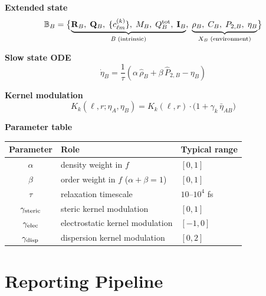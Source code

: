 \documentclass[11pt]{article}
\begin{document}
\begin{specbox}
\textbf{Extended state}
\begin{equation*}
  \mathbb{B}_B = \bigl\{
	\underbrace{
	  \mathbf{R}_B,\;
	  \mathbf{Q}_B,\;
	  \{c_{\ell m}^{(k)}\},\;
	  M_B,\;
	  Q_B^{\rm tot},\;
	  \mathbf{I}_B
	}_{B\;\text{(intrinsic)}},\;
	\underbrace{
	  \rho_B,\;
	  C_B,\;
	  P_{2,B},\;
	  \eta_B
	}_{X_B\;\text{(environment)}}
  \bigr\}
\end{equation*}

\medskip
\textbf{Slow state ODE}
\begin{equation*}
  \dot\eta_B = \frac{1}{\tau}\!\left(
	\alpha\,\hat\rho_B + \beta\,\hat P_{2,B} - \eta_B
  \right)
\end{equation*}

\medskip
\textbf{Kernel modulation}
\begin{equation*}
  K_k(\ell,r;\eta_A,\eta_B) = K_k(\ell,r)\cdot\bigl(1+\gamma_k\,\bar\eta_{AB}\bigr)
\end{equation*}

\medskip
\textbf{Parameter table}

\begin{center}
\begin{tabular}{cll}
  \toprule
  \textbf{Parameter} & \textbf{Role} & \textbf{Typical range} \\
  \midrule
  $\alpha$                    & density weight in $f$               & $[0,1]$ \\
  $\beta$                     & order weight in $f$ \;($\alpha+\beta=1$) & $[0,1]$ \\
  $\tau$                      & relaxation timescale                 & $10$--$10^4$ fs \\
  $\gamma_{\rm steric}$       & steric kernel modulation             & $[0,1]$ \\
  $\gamma_{\rm elec}$         & electrostatic kernel modulation      & $[-1,0]$ \\
  $\gamma_{\rm disp}$         & dispersion kernel modulation         & $[0,2]$ \\
  \bottomrule
\end{tabular}
\end{center}
\end{specbox}

\section{Reporting Pipeline}
\label{sec:pipeline}
\end{document}
